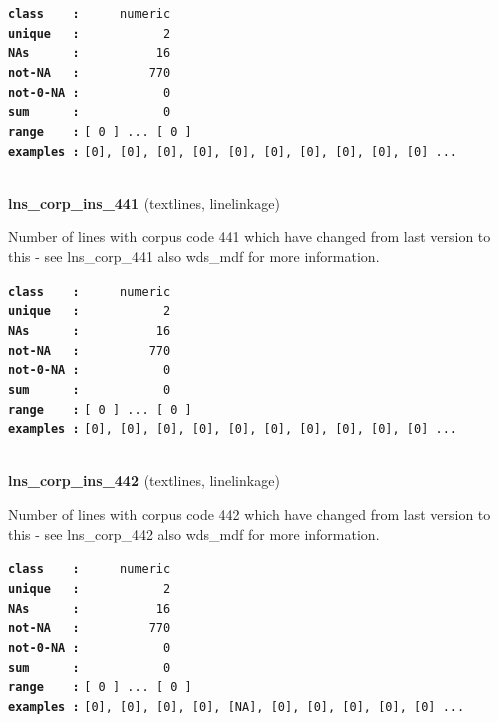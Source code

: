 \documentclass[]{article}
\begin{document}
\textbf{\texttt{class\ \ \ \ :}} \texttt{~~~~~numeric}\\
\textbf{\texttt{unique\ \ \ :}} \texttt{~~~~~~~~~~~2}\\
\textbf{\texttt{NAs\ \ \ \ \ \ :}} \texttt{~~~~~~~~~~16}\\
\textbf{\texttt{not-NA\ \ \ :}} \texttt{~~~~~~~~~770}\\
\textbf{\texttt{not-0-NA\ :}} \texttt{~~~~~~~~~~~0}\\
\textbf{\texttt{sum\ \ \ \ \ \ :}} \texttt{~~~~~~~~~~~0}\\
\textbf{\texttt{range\ \ \ \ :}}
\texttt{{[}\ 0\ {]}\ ...\ {[}\ 0\ {]}}\\
\textbf{\texttt{examples\ :}}
\texttt{{[}0{]},\ {[}0{]},\ {[}0{]},\ {[}0{]},\ {[}0{]},\ {[}0{]},\ {[}0{]},\ {[}0{]},\ {[}0{]},\ {[}0{]}\ ...}\\

~

\textbf{lns\_corp\_ins\_441} (textlines, linelinkage)

Number of lines with corpus code 441 which have changed from last
version to this - see lns\_corp\_441 also wds\_mdf for more information.

\textbf{\texttt{class\ \ \ \ :}} \texttt{~~~~~numeric}\\
\textbf{\texttt{unique\ \ \ :}} \texttt{~~~~~~~~~~~2}\\
\textbf{\texttt{NAs\ \ \ \ \ \ :}} \texttt{~~~~~~~~~~16}\\
\textbf{\texttt{not-NA\ \ \ :}} \texttt{~~~~~~~~~770}\\
\textbf{\texttt{not-0-NA\ :}} \texttt{~~~~~~~~~~~0}\\
\textbf{\texttt{sum\ \ \ \ \ \ :}} \texttt{~~~~~~~~~~~0}\\
\textbf{\texttt{range\ \ \ \ :}}
\texttt{{[}\ 0\ {]}\ ...\ {[}\ 0\ {]}}\\
\textbf{\texttt{examples\ :}}
\texttt{{[}0{]},\ {[}0{]},\ {[}0{]},\ {[}0{]},\ {[}0{]},\ {[}0{]},\ {[}0{]},\ {[}0{]},\ {[}0{]},\ {[}0{]}\ ...}\\

~

\textbf{lns\_corp\_ins\_442} (textlines, linelinkage)

Number of lines with corpus code 442 which have changed from last
version to this - see lns\_corp\_442 also wds\_mdf for more information.

\textbf{\texttt{class\ \ \ \ :}} \texttt{~~~~~numeric}\\
\textbf{\texttt{unique\ \ \ :}} \texttt{~~~~~~~~~~~2}\\
\textbf{\texttt{NAs\ \ \ \ \ \ :}} \texttt{~~~~~~~~~~16}\\
\textbf{\texttt{not-NA\ \ \ :}} \texttt{~~~~~~~~~770}\\
\textbf{\texttt{not-0-NA\ :}} \texttt{~~~~~~~~~~~0}\\
\textbf{\texttt{sum\ \ \ \ \ \ :}} \texttt{~~~~~~~~~~~0}\\
\textbf{\texttt{range\ \ \ \ :}}
\texttt{{[}\ 0\ {]}\ ...\ {[}\ 0\ {]}}\\
\textbf{\texttt{examples\ :}}
\texttt{{[}0{]},\ {[}0{]},\ {[}0{]},\ {[}0{]},\ {[}NA{]},\ {[}0{]},\ {[}0{]},\ {[}0{]},\ {[}0{]},\ {[}0{]}\ ...}\\
\end{document}
